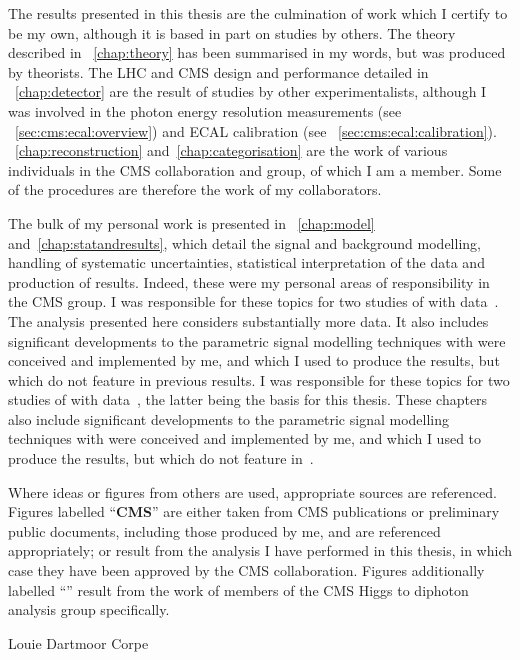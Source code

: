 \begin{declaration}
The results presented in this thesis are the culmination of work which I certify to be my own, although it is based in part on studies by others. The theory described in \Chap~\ref{chap:theory} has been summarised in my words, but was produced by theorists. The LHC and CMS design and performance detailed in \Chap~\ref{chap:detector} are the result of studies by other experimentalists, although I was involved in the \RunI photon energy resolution measurements (see \Sec~\ref{sec:cms:ecal:overview}) and \RunII ECAL calibration (see \Sec~\ref{sec:cms:ecal:calibration}).
\Chap\s~\ref{chap:reconstruction} and~\ref{chap:categorisation} are the work of various individuals in the CMS collaboration and \Hgg group, of which I am a member. Some of the procedures are therefore the work of my collaborators.

The bulk of my personal work is presented in \Chap\s~\ref{chap:model} and~\ref{chap:statandresults}, which detail the signal and background modelling, handling of systematic uncertainties, statistical interpretation of the data and production of results. Indeed, these were my personal areas of responsibility in the CMS \Hgg group. 
\ifNewAnalysis
I was responsible for these topics for two studies of \Hgg with \RunII data~\cite{CMS-PAS-HIG-15-005,CMS-PAS-HIG-16-020}. The analysis presented here considers substantially more data. It also includes significant developments to the parametric signal modelling techniques with were conceived and implemented by me, and which I used to produce the results, but which do not feature in previous results.  
\else
I was responsible for these topics for two studies of \Hgg with \RunII data~\cite{CMS-PAS-HIG-15-005,CMS-PAS-HIG-16-020}, the latter being the basis for this thesis. These chapters also include significant developments to the parametric signal modelling techniques with were conceived and implemented by me, and which I used to produce the results, but which do not feature in~\cite{CMS-PAS-HIG-16-020}.  
\fi

Where ideas or figures from others are used, appropriate sources are referenced. Figures labelled ``\textbf{CMS}'' are either taken from CMS publications or preliminary public documents, including those produced by me, and are referenced appropriately; or result from the analysis I have performed in this thesis, in which case they have been approved by the CMS collaboration. Figures additionally labelled ``\Hgg'' result from the work of members of the CMS Higgs to diphoton analysis group specifically.
  \begin{flushright}
    Louie Dartmoor Corpe
  \end{flushright}
\end{declaration}


